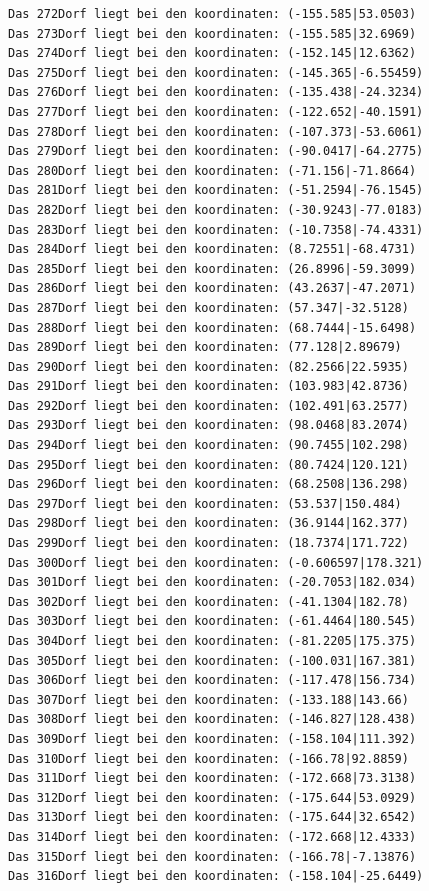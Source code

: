 \documentclass{article}
\begin{document}
\begin{verbatim}
Das 272Dorf liegt bei den koordinaten: (-155.585|53.0503)
Das 273Dorf liegt bei den koordinaten: (-155.585|32.6969)
Das 274Dorf liegt bei den koordinaten: (-152.145|12.6362)
Das 275Dorf liegt bei den koordinaten: (-145.365|-6.55459)
Das 276Dorf liegt bei den koordinaten: (-135.438|-24.3234)
Das 277Dorf liegt bei den koordinaten: (-122.652|-40.1591)
Das 278Dorf liegt bei den koordinaten: (-107.373|-53.6061)
Das 279Dorf liegt bei den koordinaten: (-90.0417|-64.2775)
Das 280Dorf liegt bei den koordinaten: (-71.156|-71.8664)
Das 281Dorf liegt bei den koordinaten: (-51.2594|-76.1545)
Das 282Dorf liegt bei den koordinaten: (-30.9243|-77.0183)
Das 283Dorf liegt bei den koordinaten: (-10.7358|-74.4331)
Das 284Dorf liegt bei den koordinaten: (8.72551|-68.4731)
Das 285Dorf liegt bei den koordinaten: (26.8996|-59.3099)
Das 286Dorf liegt bei den koordinaten: (43.2637|-47.2071)
Das 287Dorf liegt bei den koordinaten: (57.347|-32.5128)
Das 288Dorf liegt bei den koordinaten: (68.7444|-15.6498)
Das 289Dorf liegt bei den koordinaten: (77.128|2.89679)
Das 290Dorf liegt bei den koordinaten: (82.2566|22.5935)
Das 291Dorf liegt bei den koordinaten: (103.983|42.8736)
Das 292Dorf liegt bei den koordinaten: (102.491|63.2577)
Das 293Dorf liegt bei den koordinaten: (98.0468|83.2074)
Das 294Dorf liegt bei den koordinaten: (90.7455|102.298)
Das 295Dorf liegt bei den koordinaten: (80.7424|120.121)
Das 296Dorf liegt bei den koordinaten: (68.2508|136.298)
Das 297Dorf liegt bei den koordinaten: (53.537|150.484)
Das 298Dorf liegt bei den koordinaten: (36.9144|162.377)
Das 299Dorf liegt bei den koordinaten: (18.7374|171.722)
Das 300Dorf liegt bei den koordinaten: (-0.606597|178.321)
Das 301Dorf liegt bei den koordinaten: (-20.7053|182.034)
Das 302Dorf liegt bei den koordinaten: (-41.1304|182.78)
Das 303Dorf liegt bei den koordinaten: (-61.4464|180.545)
Das 304Dorf liegt bei den koordinaten: (-81.2205|175.375)
Das 305Dorf liegt bei den koordinaten: (-100.031|167.381)
Das 306Dorf liegt bei den koordinaten: (-117.478|156.734)
Das 307Dorf liegt bei den koordinaten: (-133.188|143.66)
Das 308Dorf liegt bei den koordinaten: (-146.827|128.438)
Das 309Dorf liegt bei den koordinaten: (-158.104|111.392)
Das 310Dorf liegt bei den koordinaten: (-166.78|92.8859)
Das 311Dorf liegt bei den koordinaten: (-172.668|73.3138)
Das 312Dorf liegt bei den koordinaten: (-175.644|53.0929)
Das 313Dorf liegt bei den koordinaten: (-175.644|32.6542)
Das 314Dorf liegt bei den koordinaten: (-172.668|12.4333)
Das 315Dorf liegt bei den koordinaten: (-166.78|-7.13876)
Das 316Dorf liegt bei den koordinaten: (-158.104|-25.6449)

\end{verbatim}
\end{document}
